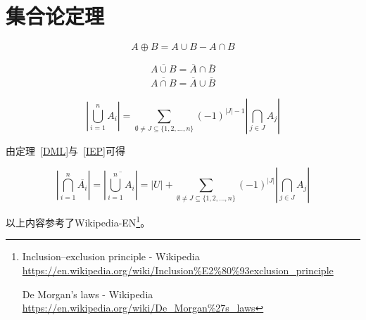 \section{集合论定理}
\begin{theorem}
	\begin{displaymath}
		A\oplus B=A\cup B - A\cap B
	\end{displaymath}
\end{theorem}
\begin{theorem}\label{DML}
	\begin{eqnarray*}
		\overline{A\cup B}=\overline{A}\cap \overline{B} \\
		\overline{A\cap B}=\overline{A}\cup \overline{B}
	\end{eqnarray*}
\end{theorem}
\begin{theorem}\label{IEP}
	\begin{displaymath}
		\left|\bigcup_{i=1}^n{A_i}\right|=
		\sum_{\emptyset \neq J\subseteq \{1,2,\ldots,n\}}{(-1)^{|J|-1}
			\left|\bigcap_{j\in J}{A_j}\right|}
	\end{displaymath}
\end{theorem}

由定理~\ref{DML}与~\ref{IEP}可得

\begin{theorem}
	\begin{displaymath}
		\left|\bigcap_{i=1}^n\overline{A_i}\right|=
		\left|\overline{\bigcup_{i=1}^n{A_i}}\right|=
		|U|+\sum_{\emptyset \neq J\subseteq \{1,2,\ldots,n\}}{(-1)^{|J|}
			\left|\bigcap_{j\in J}{A_j}\right|}
	\end{displaymath}
\end{theorem}

以上内容参考了Wikipedia-EN\footnote{Inclusion–exclusion principle - Wikipedia
	\url{https://en.wikipedia.org/wiki/Inclusion\%E2\%80\%93exclusion\_principle}

	De Morgan's laws - Wikipedia
    \url{https://en.wikipedia.org/wiki/De\_Morgan\%27s\_laws}}。
